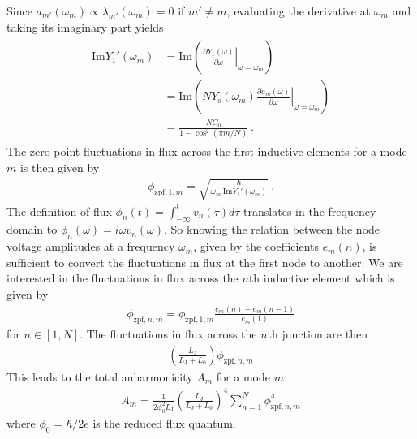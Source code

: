 Since $a_{m'}(\omega_m)\propto \lambda_{m'}(\omega_m) = 0$ if $m'\ne m$, evaluating the derivative at $\omega_m$ and taking its imaginary part yields
\begin{align}
\begin{split}
\text{Im}Y_1'(\omega_m)&=\text{Im}\left(\left.\frac{\partial Y_{1}(\omega)}{\partial\omega}\right|_{\omega = \omega_m}\right)\\
&=  \text{Im}\left(NY_\text{s}(\omega_m)\left. \frac{\partial a_m(\omega)}{\partial\omega}\right|_{\omega = \omega_m}\right)\\
&=\frac{N C_0}{1-\cos^2 (\pi m/ N)}\ .
\label{eq:anh-y1p}
\end{split}
\end{align}
The zero-point fluctuations in flux across the first inductive elements for a mode $m$ is then given by \cite{gelyQuCATQuantumCircuit2019,niggBlackBoxSuperconductingCircuit2012}
\begin{align}
\phi_{\text{zpf},1,m} = \sqrt{\frac{\hbar}{\omega_m~\text{Im}Y_1'(\omega_m)}}\ .
\end{align}
The definition of flux \cite{vool_introductionquantum_2017} $\phi_n(t) = \int_{-\infty}^tv_n(\tau)d\tau$ translates in the frequency domain to $\phi_n(\omega) = i\omega v_n(\omega)$.
%
So knowing the relation between the node voltage amplitudes at a frequency $\omega_m$, given by the coefficients $e_m(n)$, is sufficient to convert the fluctuations in flux at the first node to another.
%
We are interested in the fluctuations in flux across the $n$th inductive element which is given by
\begin{align}
\phi_{\text{zpf},n,m} = \phi_{\text{zpf},1,m}\frac{e_m(n)-e_m(n-1)}{e_m(1)}
\end{align}
for $n\in[1,N]$.
%
The fluctuations in flux across the $n$th junction are then
\begin{align}
\left(\frac{L_\text{J}}{L_\text{J}+L_0}\right)\phi_{\text{zpf},n,m}
\end{align}
%
This leads to the total anharmonicity $A_m$ for a mode $m$
\begin{align}
A_m = \frac{1}{2\phi_0^2L_\text{J}}\left(\frac{L_\text{J}}{L_\text{J}+L_0}\right)^4\sum_{n=1}^{N}\phi_{\text{zpf},n,m}^4
\label{eq:anh-qucat}
\end{align}
where $\phi_0 = \hbar/2e$ is the reduced flux quantum.

